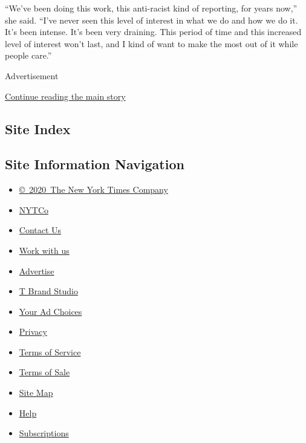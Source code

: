 ``We've been doing this work, this anti-racist kind of reporting, for
years now,'' she said. ``I've never seen this level of interest in what
we do and how we do it. It's been intense. It's been very draining. This
period of time and this increased level of interest won't last, and I
kind of want to make the most out of it while people care.''

Advertisement

\protect\hyperlink{after-bottom}{Continue reading the main story}

\hypertarget{site-index}{%
\subsection{Site Index}\label{site-index}}

\hypertarget{site-information-navigation}{%
\subsection{Site Information
Navigation}\label{site-information-navigation}}

\begin{itemize}
\tightlist
\item
  \href{https://help.nytimes.com/hc/en-us/articles/115014792127-Copyright-notice}{©~2020~The
  New York Times Company}
\end{itemize}

\begin{itemize}
\tightlist
\item
  \href{https://www.nytco.com/}{NYTCo}
\item
  \href{https://help.nytimes.com/hc/en-us/articles/115015385887-Contact-Us}{Contact
  Us}
\item
  \href{https://www.nytco.com/careers/}{Work with us}
\item
  \href{https://nytmediakit.com/}{Advertise}
\item
  \href{http://www.tbrandstudio.com/}{T Brand Studio}
\item
  \href{https://www.nytimes.com/privacy/cookie-policy\#how-do-i-manage-trackers}{Your
  Ad Choices}
\item
  \href{https://www.nytimes.com/privacy}{Privacy}
\item
  \href{https://help.nytimes.com/hc/en-us/articles/115014893428-Terms-of-service}{Terms
  of Service}
\item
  \href{https://help.nytimes.com/hc/en-us/articles/115014893968-Terms-of-sale}{Terms
  of Sale}
\item
  \href{https://spiderbites.nytimes.com}{Site Map}
\item
  \href{https://help.nytimes.com/hc/en-us}{Help}
\item
  \href{https://www.nytimes.com/subscription?campaignId=37WXW}{Subscriptions}
\end{itemize}
